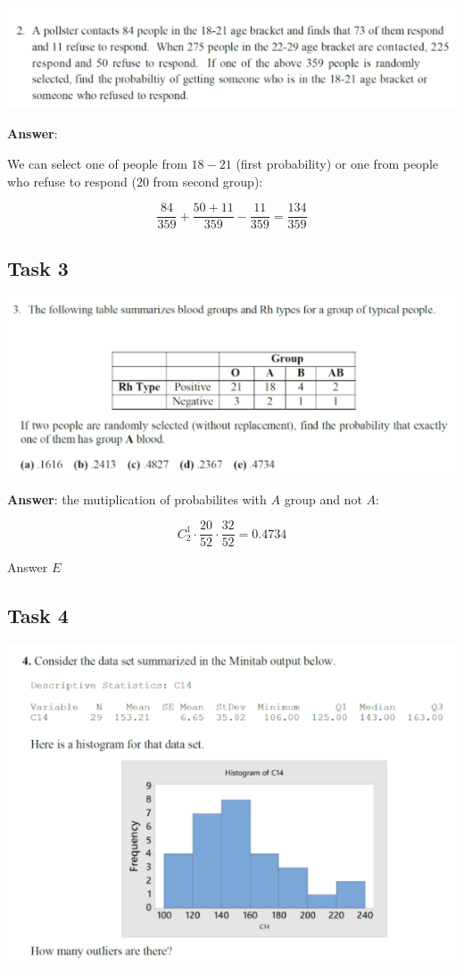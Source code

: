\documentclass[%
12pt, %
final, %
oneside, %
onecolumn, %
centertags]{article} %
\theoremstyle{plain}
\theoremstyle{definition}
\theoremstyle{remark}
\begin{document}
\begin{center}
\includegraphics[scale=0.9]{2.png}
\end{center}

\textbf{Answer}: 

We can select one of people from $18-21$ (first probability) or one from people who refuse to respond ($20$ from second group):

$$\frac{84}{359} + \frac{50 + 11}{359} - \frac{11}{359} = \frac{134}{359}$$

\subsection{Task 3}

\begin{center}
\includegraphics[scale=0.9]{3.png}
\end{center}

\textbf{Answer}: the mutiplication of probabilites with $A$ group and not $A$:

$$C_2^1 \cdot \frac{20}{52} \cdot \frac{32}{52} = 0.4734$$

Answer $E$

\subsection{Task 4}

\begin{center}
\includegraphics[scale=0.9]{4.png}
\end{center}
\end{document}
